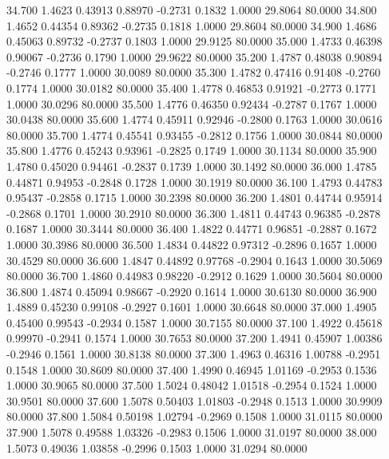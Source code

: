   34.700   1.4623   0.43913   0.88970  -0.2731   0.1832   1.0000  29.8064  80.0000
  34.800   1.4652   0.44354   0.89362  -0.2735   0.1818   1.0000  29.8604  80.0000
  34.900   1.4686   0.45063   0.89732  -0.2737   0.1803   1.0000  29.9125  80.0000
  35.000   1.4733   0.46398   0.90067  -0.2736   0.1790   1.0000  29.9622  80.0000
  35.200   1.4787   0.48038   0.90894  -0.2746   0.1777   1.0000  30.0089  80.0000
  35.300   1.4782   0.47416   0.91408  -0.2760   0.1774   1.0000  30.0182  80.0000
  35.400   1.4778   0.46853   0.91921  -0.2773   0.1771   1.0000  30.0296  80.0000
  35.500   1.4776   0.46350   0.92434  -0.2787   0.1767   1.0000  30.0438  80.0000
  35.600   1.4774   0.45911   0.92946  -0.2800   0.1763   1.0000  30.0616  80.0000
  35.700   1.4774   0.45541   0.93455  -0.2812   0.1756   1.0000  30.0844  80.0000
  35.800   1.4776   0.45243   0.93961  -0.2825   0.1749   1.0000  30.1134  80.0000
  35.900   1.4780   0.45020   0.94461  -0.2837   0.1739   1.0000  30.1492  80.0000
  36.000   1.4785   0.44871   0.94953  -0.2848   0.1728   1.0000  30.1919  80.0000
  36.100   1.4793   0.44783   0.95437  -0.2858   0.1715   1.0000  30.2398  80.0000
  36.200   1.4801   0.44744   0.95914  -0.2868   0.1701   1.0000  30.2910  80.0000
  36.300   1.4811   0.44743   0.96385  -0.2878   0.1687   1.0000  30.3444  80.0000
  36.400   1.4822   0.44771   0.96851  -0.2887   0.1672   1.0000  30.3986  80.0000
  36.500   1.4834   0.44822   0.97312  -0.2896   0.1657   1.0000  30.4529  80.0000
  36.600   1.4847   0.44892   0.97768  -0.2904   0.1643   1.0000  30.5069  80.0000
  36.700   1.4860   0.44983   0.98220  -0.2912   0.1629   1.0000  30.5604  80.0000
  36.800   1.4874   0.45094   0.98667  -0.2920   0.1614   1.0000  30.6130  80.0000
  36.900   1.4889   0.45230   0.99108  -0.2927   0.1601   1.0000  30.6648  80.0000
  37.000   1.4905   0.45400   0.99543  -0.2934   0.1587   1.0000  30.7155  80.0000
  37.100   1.4922   0.45618   0.99970  -0.2941   0.1574   1.0000  30.7653  80.0000
  37.200   1.4941   0.45907   1.00386  -0.2946   0.1561   1.0000  30.8138  80.0000
  37.300   1.4963   0.46316   1.00788  -0.2951   0.1548   1.0000  30.8609  80.0000
  37.400   1.4990   0.46945   1.01169  -0.2953   0.1536   1.0000  30.9065  80.0000
  37.500   1.5024   0.48042   1.01518  -0.2954   0.1524   1.0000  30.9501  80.0000
  37.600   1.5078   0.50403   1.01803  -0.2948   0.1513   1.0000  30.9909  80.0000
  37.800   1.5084   0.50198   1.02794  -0.2969   0.1508   1.0000  31.0115  80.0000
  37.900   1.5078   0.49588   1.03326  -0.2983   0.1506   1.0000  31.0197  80.0000
  38.000   1.5073   0.49036   1.03858  -0.2996   0.1503   1.0000  31.0294  80.0000

